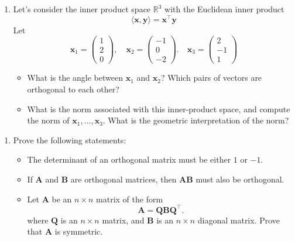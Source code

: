 \documentclass[
]{book}
\providecommand{\tightlist}{%
  \setlength{\itemsep}{0pt}\setlength{\parskip}{0pt}}
\theoremstyle{definition}
\theoremstyle{definition}
\theoremstyle{definition}
\theoremstyle{definition}
\theoremstyle{remark}
\begin{document}
\begin{enumerate}
\def\labelenumi{\arabic{enumi}.}
\setcounter{enumi}{2}
\item
  Let's consider the inner product space \(\mathbb{R}^3\) with the Euclidean inner product
  \[\langle \mathbf x, \mathbf y\rangle = \mathbf x^\top \mathbf y\]
  Let
  \[\mathbf x_1 = \left(\begin{array}{c}1\\2\\0\end{array}\right), \quad \mathbf x_2 = \left(\begin{array}{c}-1\\0\\-2\end{array}\right). \quad \mathbf x_3 = \left(\begin{array}{c}2\\-1\\1\end{array}\right)
    \]

  \begin{itemize}
  \tightlist
  \item
    What is the angle between \(\mathbf x_1\) and \(\mathbf x_2\)? Which pairs of vectors are orthogonal to each other?
  \item
    What is the norm associated with this inner-product space, and compute the norm of \(\mathbf x_1, \ldots, \mathbf x_3\). What is the geometric interpretation of the norm?
  \end{itemize}
\end{enumerate}

\begin{enumerate}
\def\labelenumi{\arabic{enumi}.}
\setcounter{enumi}{3}
\tightlist
\item
  Prove the following statements:

  \begin{itemize}
  \tightlist
  \item
    The determinant of an orthogonal matrix must be either \(1\) or \(-1\).
  \item
    If \(\mathbf A\) and \(\mathbf B\) are orthogonal matrices, then \(\mathbf A\mathbf B\) must also be orthogonal.
  \item
    Let \(\mathbf A\) be an \(n\times n\) matrix of the form
    \[\mathbf A= \mathbf Q\mathbf B\mathbf Q^\top.\]
    where \(\mathbf Q\) is an \(n\times n\) matrix, and \(\mathbf B\) is an \(n\times n\) diagonal matrix. Prove that \(\mathbf A\) is symmetric.
  \end{itemize}
\end{enumerate}
\end{document}
